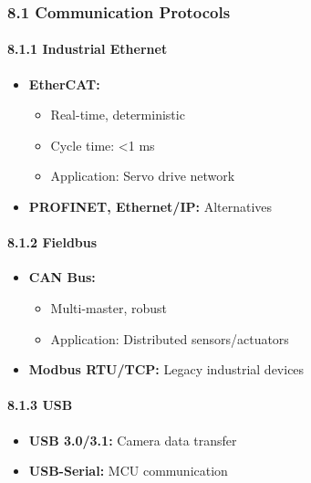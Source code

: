 \documentclass[
]{article}
\providecommand{\tightlist}{%
  \setlength{\itemsep}{0pt}\setlength{\parskip}{0pt}}
\begin{document}
\hypertarget{communication-protocols}{%
\subsubsection{8.1 Communication
Protocols}\label{communication-protocols}}

\hypertarget{industrial-ethernet}{%
\paragraph{8.1.1 Industrial Ethernet}\label{industrial-ethernet}}

\begin{itemize}
\tightlist
\item
  \textbf{EtherCAT:}

  \begin{itemize}
  \tightlist
  \item
    Real-time, deterministic
  \item
    Cycle time: \textless1 ms
  \item
    Application: Servo drive network
  \end{itemize}
\item
  \textbf{PROFINET, Ethernet/IP:} Alternatives
\end{itemize}

\hypertarget{fieldbus}{%
\paragraph{8.1.2 Fieldbus}\label{fieldbus}}

\begin{itemize}
\tightlist
\item
  \textbf{CAN Bus:}

  \begin{itemize}
  \tightlist
  \item
    Multi-master, robust
  \item
    Application: Distributed sensors/actuators
  \end{itemize}
\item
  \textbf{Modbus RTU/TCP:} Legacy industrial devices
\end{itemize}

\hypertarget{usb}{%
\paragraph{8.1.3 USB}\label{usb}}

\begin{itemize}
\tightlist
\item
  \textbf{USB 3.0/3.1:} Camera data transfer
\item
  \textbf{USB-Serial:} MCU communication
\end{itemize}
\end{document}
